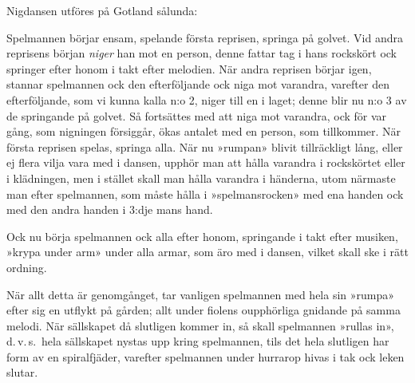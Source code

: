{
\vspace{0.7cm}
Nigdansen utföres på Gotland sålunda:\medskip{}

Spelmannen börjar ensam, spelande första reprisen, springa på golvet.
Vid andra reprisens början \textit{niger} han mot en person, denne
fattar tag i hans rockskört ock springer efter honom i takt efter melodien.
När andra reprisen börjar igen, stannar spelmannen ock den efterföljande
ock niga mot varandra, varefter den efterföljande, som vi kunna kalla
n:o 2, niger till en i laget; denne blir nu n:o 3 av de springande
på golvet. Så fortsättes med att niga mot varandra, ock för var gång,
som nigningen försiggår, ökas antalet med en person, som tillkommer.
När första reprisen spelas, springa alla. När nu »rumpan» blivit tillräckligt
lång, eller ej flera vilja vara med i dansen, upphör man att hålla
varandra i rockskörtet eller i klädningen, men i stället skall man
hålla varandra i händerna, utom närmaste man efter spelmannen, som
måste hålla i »spelmansrocken» med ena handen ock med den andra handen
i 3:dje mans hand.

\setlength{\parindent}{1.5em}
Ock nu börja spelmannen ock alla efter honom, springande i takt efter
musiken, »krypa under arm» under alla armar, som äro med i dansen,
vilket skall ske i rätt ordning.

När allt detta är genomgånget, tar vanligen spelmannen med hela sin
»rumpa» efter sig en utflykt på gården; allt under fiolens oupphörliga
gnidande på samma melodi. När sällskapet då slutligen kommer in, så
skall spelmannen »rullas in», d.\,v.\,s.\ hela sällskapet nystas
upp kring spelmannen, tils det hela slutligen har form av en spiralfjäder,
varefter spelmannen under hurrarop hivas i tak ock leken slutar.
\vspace{0.3cm}
}

